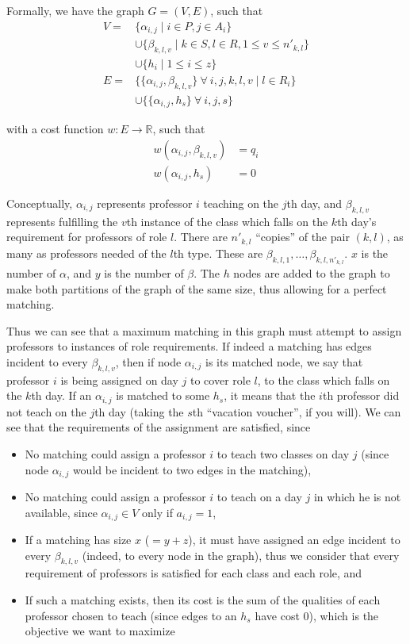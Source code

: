 Formally, we have the graph $G = (V, E)$, such that
\begin{align*}
V = & \{\alpha_{i, j} \mid i \in P, j \in A_i\}\\
    & \cup \{\beta_{k, l, v} \mid k \in S, l \in R, 1 \le v \le n'_{k, l}\}\\
    & \cup \{h_i \mid 1 \le i \le z\}\\
E = & \{\{\alpha_{i, j}, \beta_{k, l, v}\}\ \forall\ i, j, k, l, v \mid l \in R_i\}\\
    & \cup \{\{\alpha_{i, j}, h_s\}\ \forall\ i, j, s\}
\end{align*}

with a cost function $w: E \to \mathbb{R}$, such that
\begin{align*}
w(\alpha_{i, j}, \beta_{k, l, v}) &= q_i\\
w(\alpha_{i, j}, h_s) &= 0
\end{align*}

Conceptually, $\alpha_{i, j}$ represents professor $i$ teaching on the $j$th day, and $\beta_{k, l, v}$ represents fulfilling the $v$th instance of the class which falls on the $k$th day's requirement for professors of role $l$. There are $n'_{k, l}$ ``copies'' of the pair $(k, l)$, as many as professors needed of the $l$th type. These are $\beta_{k, l, 1}, \dots, \beta_{k, l, n'_{k, l}}$. $x$ is the number of $\alpha$, and $y$ is the number of $\beta$. The $h$ nodes are added to the graph to make both partitions of the graph of the same size, thus allowing for a perfect matching.

Thus we can see that a maximum matching in this graph must attempt to assign professors to instances of role requirements. If indeed a matching has edges incident to every $\beta_{k, l, v}$, then if node $\alpha_{i, j}$ is its matched node, we say that professor $i$ is being assigned on day $j$ to cover role $l$, to the class which falls on the $k$th day. If an $\alpha_{i, j}$ is matched to some $h_s$, it means that the $i$th professor did not teach on the $j$th day (taking the $s$th ``vacation voucher'', if you will). We can see that the requirements of the assignment are satisfied, since

\begin{itemize}
\item No matching could assign a professor $i$ to teach two classes on day $j$ (since node $\alpha_{i, j}$ would be incident to two edges in the matching),
\item No matching could assign a professor $i$ to teach on a day $j$ in which he is not available, since $\alpha_{i, j} \in V$ only if $a_{i, j} = 1$,
\item If a matching has size $x$ ($= y + z$), it must have assigned an edge incident to every $\beta_{k, l, v}$ (indeed, to every node in the graph), thus we consider that every requirement of professors is satisfied for each class and each role, and
\item If such a matching exists, then its cost is the sum of the qualities of each professor chosen to teach (since edges to an $h_s$ have cost 0), which is the objective we want to maximize
\end{itemize}

